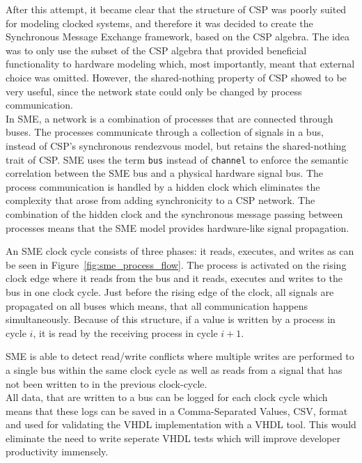 After this attempt, it became clear that the structure of CSP was poorly suited for modeling clocked systems, and therefore it was decided to create the Synchronous Message Exchange framework, based on the CSP algebra. The idea was to only use the subset of the CSP algebra that provided beneficial functionality to hardware modeling which, most importantly, meant that external choice was omitted. However, the shared-nothing property of CSP showed to be very useful, since the network state could only be changed by process communication.
\\
In SME, a network is a combination of processes that are connected through buses. The processes communicate through a collection of signals in a bus, instead of CSP's synchronous rendezvous model, but retains the shared-nothing trait of CSP.
SME uses the term \texttt{bus} instead of \texttt{channel} to enforce the semantic correlation between the SME bus and a physical hardware signal bus.
The process communication is handled by a hidden clock which eliminates the complexity that arose from adding synchronicity to a CSP network. The combination of the hidden clock and the synchronous message passing between processes means that the SME model provides hardware-like signal propagation.

An SME clock cycle consists of three phases: it reads, executes, and writes as can be seen in Figure~\ref{fig:sme_process_flow}. The process is activated on the rising clock edge where it reads from the bus and it reads, executes and writes to the bus in one clock cycle. Just before the rising edge of the clock, all signals are propagated on all buses which means, that all communication happens simultaneously. Because of this structure, if a value is written by a process in cycle $i$, it is read by the receiving process in cycle $i+1$.

SME is able to detect read/write conflicts where multiple writes are performed to a single bus within the same clock cycle as well as reads from a signal that has not been written to in the previous clock-cycle.\\
All data, that are written to a bus can be logged for each clock cycle which means that these logs can be saved in a Comma-Separated Values, CSV, format and used for validating the VHDL implementation with a VHDL tool. This would eliminate the need to write seperate VHDL tests which will improve developer productivity immensely.


